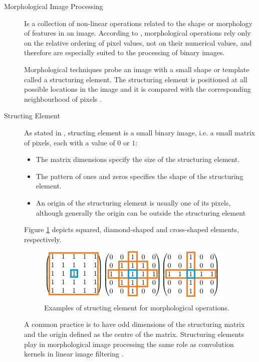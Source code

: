 \documentclass{article}
\begin{document}
\begin{description}
%
%
\item[Morphological Image Processing] Is a collection of non-linear operations related to the shape or morphology of features in an image. According to \cite{morph_wiki}, morphological operations rely only on the relative ordering of pixel values, not on their numerical values, and therefore are especially suited to the processing of binary images.

Morphological techniques probe an image with a small shape or template called a structuring element. The structuring element is positioned at all possible locations in the image and it is compared with the corresponding neighbourhood of pixels \cite{morphological}.

%
%
\item[Structing Element] As stated in \cite{morphological}, structing element is a small binary image, i.e. a small matrix of pixels, each with a value of $0$ or $1$:

\begin{itemize}
\item The matrix dimensions specify the size of the structuring element.
\item The pattern of ones and zeros specifies the shape of the structuring element.
\item An origin of the structuring element is usually one of its pixels, although generally the origin can be outside the structuring element
\end{itemize}

Figure \ref{fig:struct_exampl} depicts squared, diamond-shaped and cross-shaped elements, respectively.
\begin{figure}[H]
  \centering
  \includegraphics[width=0.7\linewidth]{_Figures/struct_el_example.jpg}
  \caption{Examples of structing element for morphological operations.}
  \label{fig:struct_exampl}
\end{figure}%


A common practice is to have odd dimensions of the structuring matrix and the origin defined as the centre of the matrix. Structuring elements play in morphological image processing the same role as convolution kernels in linear image filtering \cite{morphological}.


\end{description}
\end{document}
